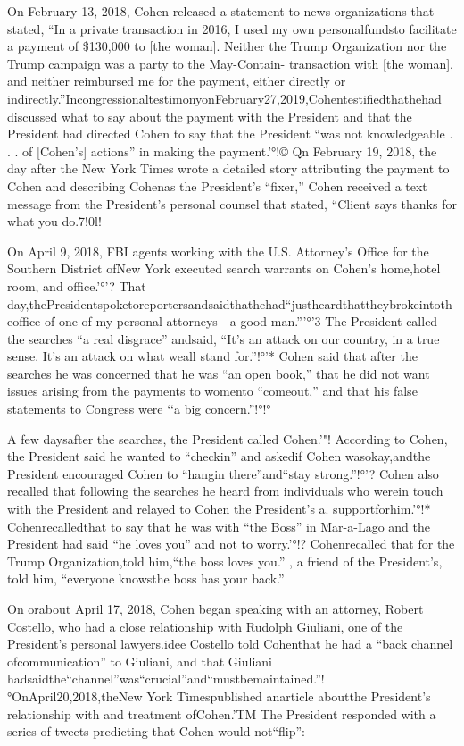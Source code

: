 On February 13, 2018, Cohen released a statement to news organizations that stated, “In a
private transaction in 2016, I used my own personalfundsto facilitate a payment of \$130,000 to
[the woman]. Neither the Trump Organization nor the Trump campaign was a party to the
May-Contain-
transaction with [the woman], and neither reimbursed me for the payment, either directly or
indirectly.”IncongressionaltestimonyonFebruary27,2019,Cohentestifiedthathehad
discussed what to say about the payment with the President and that the President had directed
Cohen to say that the President “was not knowledgeable . . . of [Cohen’s] actions” in making the
payment.'°!© Qn February 19, 2018, the day after the New York Times wrote a detailed story
attributing the payment to Cohen and describing Cohenas the President’s “fixer,” Cohen received
a text message from the President’s personal counsel that stated, “Client says thanks for what you do.7!0l!

On April 9, 2018, FBI agents working with the U.S. Attorney’s Office for the Southern District ofNew York executed search warrants on Cohen’s home,hotel room, and office.'°'? That day,thePresidentspoketoreportersandsaidthathehad“justheardthattheybrokeintotheoffice of one of my personal attorneys—a good man.”'°'3 The President called the searches “a real disgrace” andsaid, “It’s an attack on our country, in a true sense. It’s an attack on what weall stand for.”!°'* Cohen said that after the searches he was concerned that he was “an open book,” that he did not want issues arising from the payments to womento “comeout,” and that his false statements to Congress were ‘‘a big concern.”!°!°

A few daysafter the searches, the President called Cohen.'"! According to Cohen, the President said he wanted to “checkin” and askedif Cohen wasokay,andthe President encouraged Cohen to “hangin there”and“stay strong.”!°'? Cohen also recalled that following the searches he heard from individuals who werein touch with the President and relayed to Cohen the President’s
a.
supportforhim.'°!* Cohenrecalledthat
to say that he was with “the Boss” in Mar-a-Lago and the President had said “he loves you” and not to worry.'°!? Cohenrecalled that for the Trump Organization,told him,“the boss loves you.” , a friend of the President’s, told him, “everyone knowsthe boss has your back.”

On orabout April 17, 2018, Cohen began speaking with an attorney, Robert Costello, who had a close relationship with Rudolph Giuliani, one of the President’s personal lawyers.idee Costello told Cohenthat he had a “back channel ofcommunication” to Giuliani, and that Giuliani hadsaidthe“channel”was“crucial”and“mustbemaintained.”!°OnApril20,2018,theNew York Timespublished anarticle aboutthe President’s relationship with and treatment ofCohen.'TM The President responded with a series of tweets predicting that Cohen would not“flip”:

